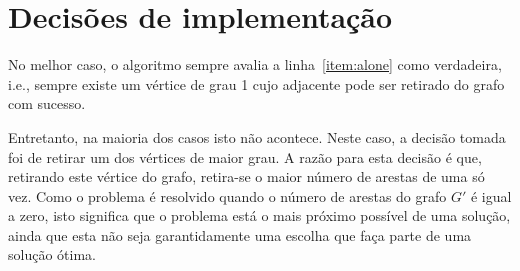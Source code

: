 \section{Decisões de implementação}
\label{sec:decisoes}

No melhor caso, o algoritmo sempre avalia a linha~\ref{item:alone}
como verdadeira, i.e., sempre existe um vértice de grau 1 cujo
adjacente pode ser retirado do grafo com sucesso.

Entretanto, na maioria dos casos isto não acontece. Neste caso, a
decisão tomada foi de retirar um dos vértices de maior grau. A razão
para esta decisão é que, retirando este vértice do grafo, retira-se o
maior número de arestas de uma só vez. Como o problema é resolvido
quando o número de arestas do grafo $G'$ é igual a zero, isto
significa que o problema está o mais próximo possível de uma solução,
ainda que esta não seja garantidamente uma escolha que faça parte de
uma solução ótima.
